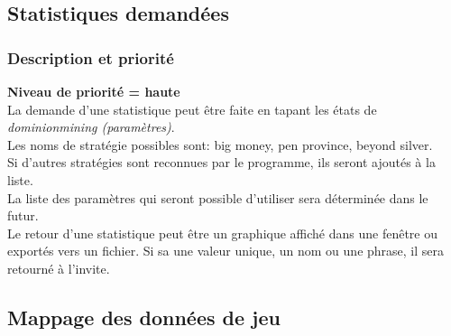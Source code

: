 \subsection{Statistiques demandées}
\subsubsection{Description et priorité}
\textbf{Niveau de priorité = haute}\\
La demande d'une statistique peut être faite en tapant les états de \textit{dominionmining (paramètres)}.  \\
Les noms de stratégie possibles sont: big money, pen province, beyond silver.\\
Si d'autres stratégies sont reconnues par le programme, ils seront ajoutés à la liste.\\
La liste des paramètres qui seront possible d'utiliser sera déterminée dans le futur.\\

Le retour d'une statistique peut être un graphique affiché dans une fenêtre ou exportés vers un fichier. Si sa une valeur unique, un nom ou une phrase, il sera retourné à l'invite.

\subsection{Mappage des données de jeu}

